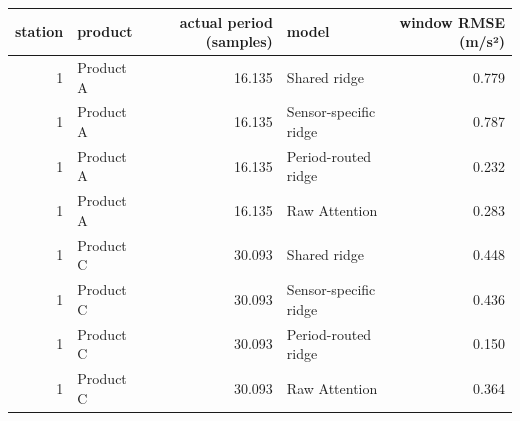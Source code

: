 \begin{tabular}{rlrlr}
\toprule
station & product & actual period (samples) & model & window RMSE (m/s²) \\
\midrule
1 & Product A & 16.135 & Shared ridge & 0.779 \\
1 & Product A & 16.135 & Sensor-specific ridge & 0.787 \\
1 & Product A & 16.135 & Period-routed ridge & 0.232 \\
1 & Product A & 16.135 & Raw Attention & 0.283 \\
1 & Product C & 30.093 & Shared ridge & 0.448 \\
1 & Product C & 30.093 & Sensor-specific ridge & 0.436 \\
1 & Product C & 30.093 & Period-routed ridge & 0.150 \\
1 & Product C & 30.093 & Raw Attention & 0.364 \\
\bottomrule
\end{tabular}
